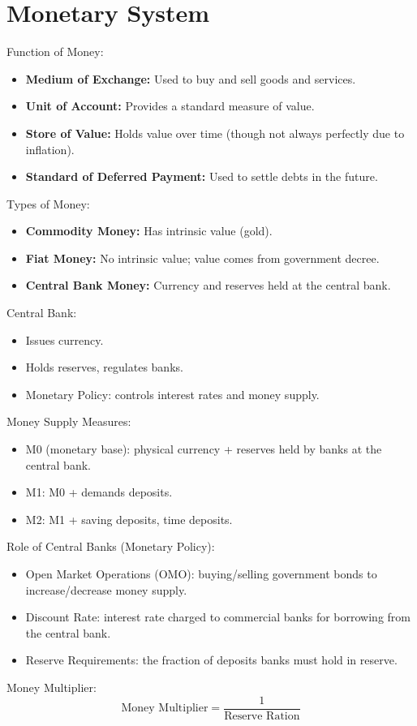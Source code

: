 \documentclass[a4paper, 11pt]{article}
\begin{document}
\section{Monetary System}
Function of Money:
\begin{itemize}
    \item \textbf{Medium of Exchange:} Used to buy and sell goods and services.
    \item \textbf{Unit of Account:} Provides a standard measure of value.
    \item \textbf{Store of Value:} Holds value over time (though not always perfectly due to inflation).
    \item \textbf{Standard of Deferred Payment:} Used to settle debts in the future.
\end{itemize}
Types of Money:
\begin{itemize}
    \item \textbf{Commodity Money:} Has intrinsic value (gold).
    \item \textbf{Fiat Money:} No intrinsic value; value comes from government decree.
    \item \textbf{Central Bank Money:} Currency and reserves held at the central bank.
\end{itemize}
Central Bank:
\begin{itemize}
    \item Issues currency.
    \item Holds reserves, regulates banks.
    \item Monetary Policy: controls interest rates and money supply.
\end{itemize}
Money Supply Measures:
\begin{itemize}
    \item M0 (monetary base): physical currency + reserves held by banks at the central bank.
    \item M1: M0 + demands deposits.
    \item M2: M1 + saving deposits, time deposits.
\end{itemize}
Role of Central Banks (Monetary Policy):
\begin{itemize}
    \item Open Market Operations (OMO): buying/selling government bonds to increase/decrease money supply.
    \item Discount Rate: interest rate charged to commercial banks for borrowing from the central bank.
    \item Reserve Requirements: the fraction of deposits banks must hold in reserve.
\end{itemize}
Money Multiplier:
\[
\text{Money Multiplier} = \frac{1}{\text{Reserve Ration}}
\]
\end{document}
